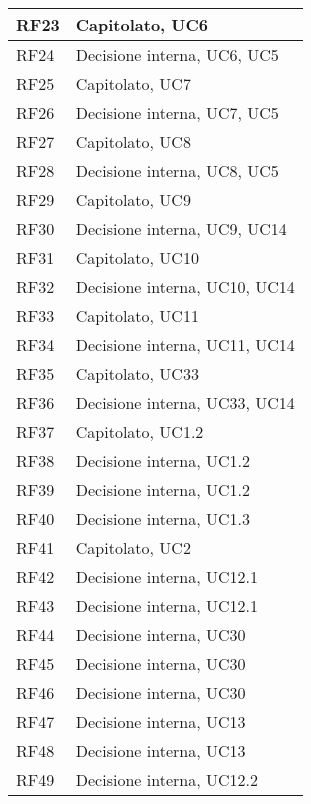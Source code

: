 \begin{center}
\begin{longtable}{|C{5cm}|C{5cm}|}
        \hline
        RF23 & Capitolato, UC6 \\
        \hline
        RF24 & Decisione interna, UC6, UC5 \\
        \hline
        RF25 & Capitolato, UC7 \\
        \hline
        RF26 & Decisione interna, UC7, UC5 \\
        \hline
        RF27 & Capitolato, UC8 \\
        \hline
        RF28 & Decisione interna, UC8, UC5 \\
        \hline
        RF29 & Capitolato, UC9 \\
        \hline
        RF30 & Decisione interna, UC9, UC14 \\
        \hline
        RF31 & Capitolato, UC10 \\
        \hline
        RF32 & Decisione interna, UC10, UC14 \\
        \hline
        RF33 & Capitolato, UC11 \\
        \hline
        RF34 & Decisione interna, UC11, UC14 \\
        \hline
        RF35 & Capitolato, UC33 \\
        \hline
        RF36 & Decisione interna, UC33, UC14 \\
        \hline
        RF37 & Capitolato, UC1.2 \\
        \hline
        RF38 & Decisione interna, UC1.2 \\
        \hline
        RF39 & Decisione interna, UC1.2 \\
        \hline
        RF40 & Decisione interna, UC1.3 \\
        \hline
        RF41 & Capitolato, UC2 \\
        \hline
        RF42 & Decisione interna, UC12.1 \\
        \hline
        RF43 & Decisione interna, UC12.1 \\
        \hline
        RF44 & Decisione interna, UC30 \\
        \hline
        RF45 & Decisione interna, UC30 \\
        \hline
        RF46 & Decisione interna, UC30 \\
        \hline
        RF47 & Decisione interna, UC13 \\
        \hline
        RF48 & Decisione interna, UC13 \\
        \hline
        RF49 & Decisione interna, UC12.2 \\
        \hline

\end{longtable}
\end{center}
